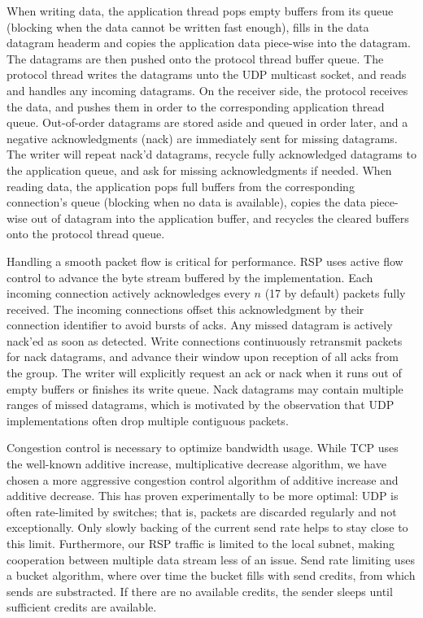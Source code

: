 When writing data, the application thread pops empty buffers from its queue
(blocking when the data cannot be written fast enough), fills in the
\textsf{data} datagram headerm and copies the application data piece-wise into
the datagram. The datagrams are then pushed onto the protocol thread buffer
queue. The protocol thread writes the datagrams unto the UDP multicast socket,
and reads and handles any incoming datagrams. On the receiver side, the protocol
receives the data, and pushes them in order to the corresponding application
thread queue. Out-of-order datagrams are stored aside and queued in order later,
and a negative acknowledgments (nack) are immediately sent for missing
datagrams. The writer will repeat nack'd datagrams, recycle fully acknowledged
datagrams to the application queue, and ask for missing acknowledgments if
needed. When reading data, the application pops full buffers from the
corresponding connection's queue (blocking when no data is available), copies
the data piece-wise out of datagram into the application buffer, and recycles
the cleared buffers onto the protocol thread queue.

Handling a smooth packet flow is critical for performance. RSP uses active flow
control to advance the byte stream buffered by the implementation. Each incoming
connection actively acknowledges every $n$ (17 by default) packets fully
received. The incoming connections offset this acknowledgment by their
connection identifier to avoid bursts of acks. Any missed datagram is actively
nack'ed as soon as detected. Write connections continuously retransmit packets
for nack datagrams, and advance their window upon reception of all acks from the
group. The writer will explicitly request an ack or nack when it runs out of
empty buffers or finishes its write queue. Nack datagrams may contain multiple
ranges of missed datagrams, which is motivated by the observation that UDP
implementations often drop multiple contiguous packets.

Congestion control is necessary to optimize bandwidth usage. While TCP uses the
well-known additive increase, multiplicative decrease algorithm, we have chosen
a more aggressive congestion control algorithm of additive increase and additive
decrease. This has proven experimentally to be more optimal: UDP is often
rate-limited by switches; that is, packets are discarded regularly and not
exceptionally. Only slowly backing of the current send rate helps to stay close
to this limit. Furthermore, our RSP traffic is limited to the local subnet,
making cooperation between multiple data stream less of an issue. Send rate
limiting uses a bucket algorithm, where over time the bucket fills with send
credits, from which sends are substracted. If there are no available credits,
the sender sleeps until sufficient credits are available.

